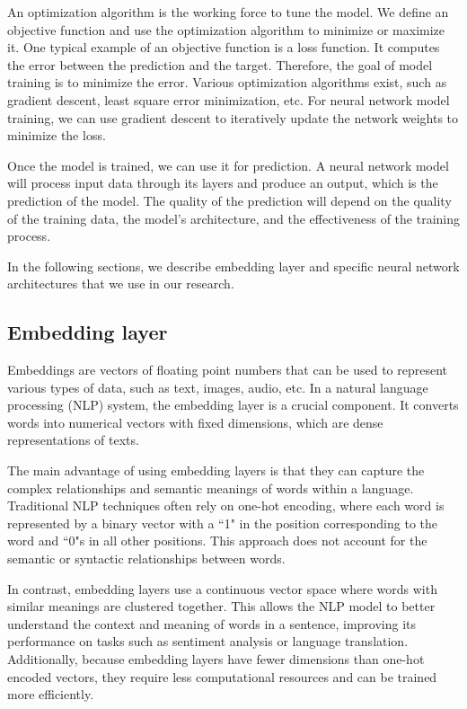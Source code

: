 An optimization algorithm is the working force to tune the model.
We define an objective function and use the optimization algorithm to minimize or maximize it. One typical example of an objective function is a loss function. It computes the error between the prediction and the target. Therefore, the goal of model training is to minimize the error. Various optimization algorithms exist, such as gradient descent, least square error minimization, etc. For neural network model training, we can use gradient descent to iteratively update the network weights to minimize the loss.
 
Once the model is trained, we can use it for prediction. A neural network model will process input data through its layers and produce an output, which is the prediction of the model. The quality of the prediction will depend on the quality of the training data, the model's architecture, and the effectiveness of the training process.

In the following sections, we describe embedding layer and specific neural network architectures that we use in our research.

\subsection{Embedding layer}
\label{sec:embedding-layer}
Embeddings are vectors of floating point numbers that can be used to represent various types of data, such as text, images, audio, etc.
In a natural language processing (NLP) system, the embedding layer is a crucial component. It converts words into numerical vectors with fixed dimensions, which are dense representations of texts.

The main advantage of using embedding layers is that they can capture the complex relationships and semantic meanings of words within a language. Traditional NLP techniques often rely on one-hot encoding, where each word is represented by a binary vector with a ``1" in the position corresponding to the word and ``0"s in all other positions. This approach does not account for the semantic or syntactic relationships between words.

In contrast, embedding layers use a continuous vector space where words with similar meanings are clustered together. This allows the NLP model to better understand the context and meaning of words in a sentence, improving its performance on tasks such as sentiment analysis or language translation. Additionally, because embedding layers have fewer dimensions than one-hot encoded vectors, they require less computational resources and can be trained more efficiently.


